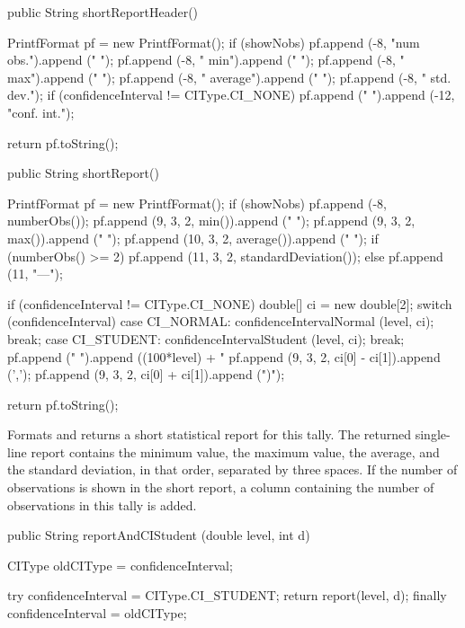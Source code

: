 \begin{code}\begin{hide}

   public String shortReportHeader() {
      PrintfFormat pf = new PrintfFormat();
      if (showNobs)
         pf.append (-8, "num obs.").append ("  ");
      pf.append (-8, "   min").append ("   ");
      pf.append (-8, "   max").append ("   ");
      pf.append (-8, "   average").append ("   ");
      pf.append (-8, "   std. dev.");
      if (confidenceInterval != CIType.CI_NONE)
         pf.append ("   ").append (-12, "conf. int.");

      return pf.toString();
   }\end{hide}

   public String shortReport()\begin{hide} {
      PrintfFormat pf = new PrintfFormat();
      if (showNobs)
         pf.append (-8, numberObs());
      pf.append (9, 3, 2, min()).append ("   ");
      pf.append (9, 3, 2, max()).append ("   ");
      pf.append (10, 3, 2, average()).append ("   ");
      if (numberObs() >= 2)
         pf.append (11, 3, 2, standardDeviation());
      else
         pf.append (11, "---");

      if (confidenceInterval != CIType.CI_NONE) {
         double[] ci = new double[2];
         switch (confidenceInterval) {
         case CI_NORMAL:
            confidenceIntervalNormal (level, ci);
            break;
         case CI_STUDENT:
            confidenceIntervalStudent (level, ci);
            break;
         }
         pf.append ("   ").append ((100*level) + "%
         pf.append (9, 3, 2, ci[0] - ci[1]).append (',');
         pf.append (9, 3, 2, ci[0] + ci[1]).append (")");
      }

      return pf.toString();
   }\end{hide}
\end{code}
\begin{tabb}   Formats and returns a short
 statistical report for this tally.
 The returned single-line report contains the minimum value,
 the maximum value,
 the average, and the standard deviation, in that order, separated
 by three spaces.  If the number of observations is shown in the short report,
 a column containing the
 number of observations in this tally is added.
\end{tabb}
\begin{htmlonly}
\end{htmlonly}
\begin{code}

    public String reportAndCIStudent (double level, int d) \begin{hide} {
      CIType oldCIType = confidenceInterval;

      try {
         confidenceInterval = CIType.CI_STUDENT;
         return report(level, d);
      } finally {
         confidenceInterval = oldCIType;
      }
  }\end{hide}
\end{code}
